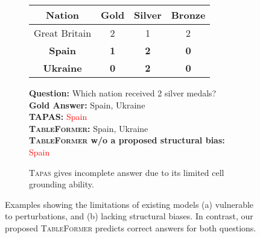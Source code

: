 \documentclass[11pt]{article}
\begin{document}
\begin{figure}[t!]
\begin{subfigure}{\linewidth} 
\begin{table}[H]
\centering
\footnotesize
\begin{tabular}{|c|c|c|c|}
\hline
\rowcolor[HTML]{FFCCC9} 
Nation           & Gold       & Silver     & Bronze     \\ \hline
\rowcolor[HTML]{DAE8FC} 
Great Britain    & 2          & 1          & 2          \\ \hline
\rowcolor[HTML]{DAE8FC} 
\textbf{Spain}   & \textbf{1} & \textbf{2} & \textbf{0} \\ \hline
\rowcolor[HTML]{DAE8FC} 
\textbf{Ukraine} & \textbf{0} & \textbf{2} & \textbf{0} \\ \hline
\end{tabular}
\end{table}
\vspace{-1em}
\textbf{Question:} Which nation received 2 silver medals? \\
\textbf{Gold Answer:} Spain, Ukraine\\
\textbf{TAPAS:} \textcolor{red}{Spain} \\
\textbf{\textsc{TableFormer}:} \textcolor{dg}{Spain, Ukraine} \\
\textbf{\textsc{TableFormer} w/o a proposed structural bias:} \textcolor{red}{Spain}
\caption{\textsc{Tapas} gives incomplete answer due to its limited cell grounding ability.}
\end{subfigure}
\caption{\label{fig:example} Examples showing the limitations of existing models (a) vulnerable to perturbations, and (b) lacking structural biases. In contrast, our proposed \textsc{TableFormer} predicts correct answers for both questions.}
\vspace{-2em}
\end{figure}
\end{document}
